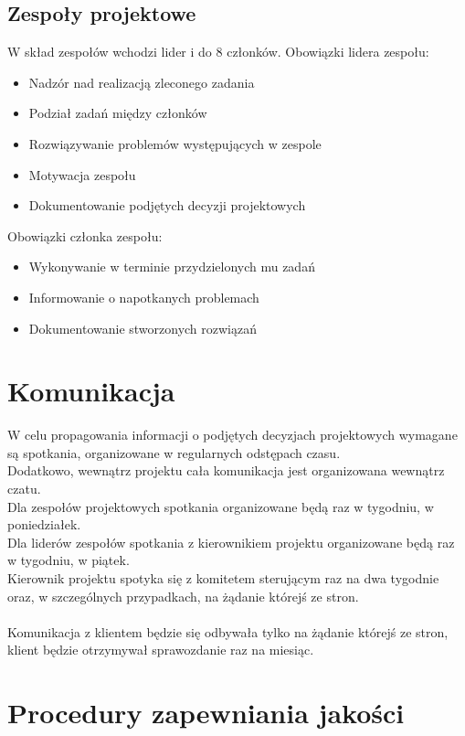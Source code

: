 \documentclass[12pt]{article}
\begin{document}
\subsection{Zespoły projektowe}
W skład zespołów wchodzi lider i do 8 członków.
Obowiązki lidera zespołu:
\begin{itemize}
\item Nadzór nad realizacją zleconego zadania
\item Podział zadań między członków
\item Rozwiązywanie problemów występujących w zespole
\item Motywacja zespołu
\item Dokumentowanie podjętych decyzji projektowych
\end{itemize}
Obowiązki członka zespołu:
\begin{itemize}
\item Wykonywanie w terminie przydzielonych mu zadań
\item Informowanie o napotkanych problemach
\item Dokumentowanie stworzonych rozwiązań
\end{itemize}

\newpage
\section{Komunikacja}
W celu propagowania informacji o podjętych decyzjach projektowych wymagane są spotkania, organizowane w regularnych odstępach czasu.\\
Dodatkowo, wewnątrz projektu cała komunikacja jest organizowana wewnątrz czatu.\\
Dla zespołów projektowych spotkania organizowane będą raz w tygodniu, w poniedziałek.\\
Dla liderów zespołów spotkania z kierownikiem projektu organizowane będą raz w tygodniu, w piątek.\\
Kierownik projektu spotyka się z komitetem sterującym raz na dwa tygodnie oraz, w szczególnych przypadkach, na żądanie którejś ze stron.\\\\
Komunikacja z klientem będzie się odbywała tylko na żądanie którejś ze stron, klient będzie otrzymywał sprawozdanie raz na miesiąc.\\

\newpage
\section{Procedury zapewniania jakości}
\end{document}
